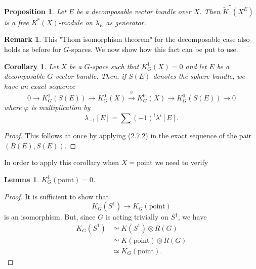 \documentclass[leqno]{book}
\numberwithin{equation}{section}
\newtheorem{proposition}[theorem]{Proposition}
\newtheorem{corollary}[theorem]{Corollary}
\newtheorem{lemma}[theorem]{Lemma}
\theoremstyle{definition}
\newtheorem*{remark}{Remark}
\begin{document}
            \begin{proposition}
              Let $E$ be a decomposable vector bundle over $X$. Then $\tilde{K}^{*}(X^{E})$ is a free $K^{*}(X)$-module on $\lambda _{E}$ as generator.
            \end{proposition}

            \begin{remark}
              This "Thom isomorphism theorem" for the decomposable case also holds as before for $G$-spaces. We now show how this fact can be put to use.
            \end{remark}

            \begin{corollary}
              Let $X$ be a $G$-space such that $K_{G}^{1}(X)=0$ and let $E$ be a decomposable $G$-vector bundle. Then, if $S(E)$ denotes the sphere bundle, we have an exact sequence
              \begin{equation*}
                0\to K_{G}^{1}(S(E))\to K_{G}^{0}(X)\stackrel{\varphi}{\rightarrow} K_{G}^{0}(X)\to K_{G}^{0}(S(E))\to 0
              \end{equation*}
              where $\varphi$ is multiplication by 
              \begin{equation*}
                \lambda_{-1}[E]=\sum (-1)^{i}\lambda^{i}[E].
              \end{equation*}
            \end{corollary}

            \begin{proof}
              This follows at once by applying (2.7.2) in the exact sequence of the pair $(B(E),S(E))$.
            \end{proof}

            In order to apply this corollary when $X=\text{point}$ we need to verify 
            \begin{lemma}
              $K_{G}^{1}(\text{point})=0$.
            \end{lemma}

            \begin{proof}
              It is sufficient to show that
              \begin{equation*}
                K_{G}(S^{1})\to K_{G}(\text{point})
              \end{equation*}
              is an isomorphism. But, since $G$ is acting trivially on $S^{1}$, we have
              \begin{equation*}
                \begin{aligned}
                  K_{G}(S^{1}) &\simeq K(S^{1})\otimes R(G) \\
                  &\simeq K(\text{point})\otimes R(G) \\
                  &\simeq K_{G}(\text{point}).
                \end{aligned}
              \end{equation*}
            \end{proof}
\end{document}
